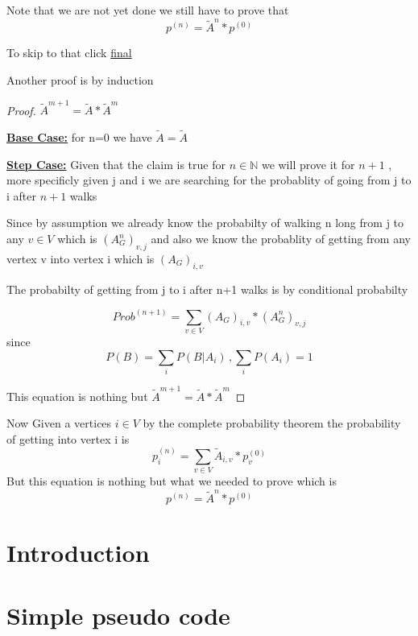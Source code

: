 \documentclass[9pt,twocolumn]{article}
\begin{document}
Note that we are not yet done we still have to prove that
\[
p^{(n)} = \tilde{A}^n * p^{(0)}
\]

To skip to that click \hyperref[final:prove]{final}

Another proof is by induction

\begin{proof}
\( \tilde{A}^{m+1} = \tilde{A} * \tilde{A}^{m}\)

\underline{\textbf{Base Case:}}
for n=0 we have \(\tilde{A} = \tilde{A}\)

\underline{\textbf{Step Case:}}
Given that the claim is true for \(n\in \mathbb{N}\) we will prove it for \(n+1\) ,
more specificly given j and i we are searching for the probablity of going from j to i  after \(n+1\) walks

Since by assumption we already know the probabilty of walking n long from j to any \(v\in V\)
 which is \( (A_G^n)_{v,j} \) and also
we know the probablity of getting from any vertex v into vertex i which is \( ( A_G )_{i,v}  \)

The probabilty of getting from j to i after n+1 walks is by conditional probabilty

\[ Prob^{(n+1)} =  \sum_{v\in V} (A_G)_{i,v}*(A_G^n)_{v,j}\]
since
\[
P(B) = \sum_{i} P(B|A_i) \,, \sum _{i} P(A_i) = 1
\]

This equation is nothing but \( \tilde{A}^{m+1} = \tilde{A} * \tilde{A}^{m}\)
\end{proof}

Now Given a vertices \(i \in V\) by the complete probability theorem the probability of getting into vertex i is
\[ p^{(n)}_i = \sum_{v \in V} \tilde{A}_{i,v}*p^{(0)}_v \]
But this equation is nothing but what we needed to prove which is
\begin{equation}
\label{final:prove}
p^{(n)} = \tilde{A}^n * p^{(0)}
\end{equation}



\section*{Introduction}
\label{sec:orgc2e4ddf}

\section*{Simple pseudo code}
\label{sec:orgfdef20e}
\end{document}
